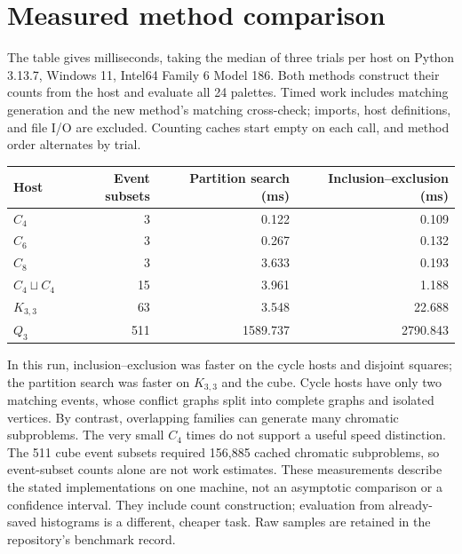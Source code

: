 \documentclass[10pt,letterpaper]{article}
\begin{document}
\section{Measured method comparison}
The table gives milliseconds, taking the median of three trials per host on
Python 3.13.7, Windows 11, Intel64 Family 6 Model 186. Both methods construct
their counts from the host and evaluate all 24 palettes. Timed work includes
matching generation and the new method's matching cross-check; imports,
host definitions, and file I/O are excluded.
Counting caches start empty on each call, and method order alternates by trial.
\begin{center}\small
\begin{tabular}{lrrr}
\toprule
Host & Event subsets & Partition search (ms) & Inclusion--exclusion (ms)\\
\midrule
$C_4$ & 3 & 0.122 & 0.109\\
$C_6$ & 3 & 0.267 & 0.132\\
$C_8$ & 3 & 3.633 & 0.193\\
$C_4\sqcup C_4$ & 15 & 3.961 & 1.188\\
$K_{3,3}$ & 63 & 3.548 & 22.688\\
$Q_3$ & 511 & 1589.737 & 2790.843\\
\bottomrule
\end{tabular}
\end{center}
In this run, inclusion--exclusion was faster on the cycle hosts and disjoint
squares; the partition search was faster on $K_{3,3}$ and the cube. Cycle
hosts have only two matching events, whose conflict graphs split
into complete graphs and isolated vertices. By contrast, overlapping families
can generate many chromatic subproblems. The very
small $C_4$ times do not support a useful speed distinction. The 511 cube
event subsets required 156,885 cached chromatic subproblems, so event-subset
counts alone are not work estimates. These measurements describe the stated
implementations on one machine, not an asymptotic comparison or a confidence
interval. They include count construction; evaluation from already-saved
histograms is a different, cheaper task. Raw samples are retained in the
repository's benchmark record.

\newpage
\end{document}
